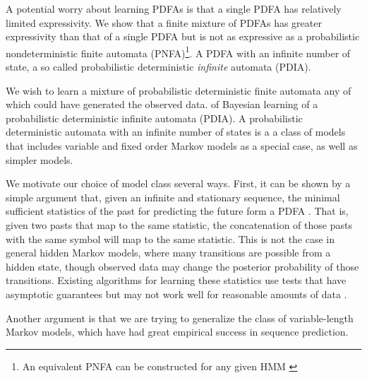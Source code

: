 A potential worry about learning PDFAs is that a single PDFA has relatively limited expressivity.  We show that a finite mixture of PDFAs has greater expressivity than that of a single PDFA but is not as expressive as a probabilistic nondeterministic finite automata (PNFA)\footnote{An equivalent PNFA can be constructed for any given HMM \cite{Dupont2005} }.  A PDFA with an infinite number of state, a so called probabilistic deterministic {\em infinite} automata (PDIA).

 We wish to learn a mixture of probabilistic deterministic finite automata any of which could have generated the observed data.  of Bayesian learning of a probabilistic deterministic infinite automata (PDIA).  A probabilistic deterministic automata with an infinite number of states is a  a class of models that includes variable and fixed order Markov models as a special case, as well as simpler models.  


We motivate our choice of model class several ways.  First, it can be shown by a simple argument that, given an infinite and stationary sequence, the minimal sufficient statistics of the past for predicting the future form a PDFA \cite{Crutchfield1999}.  That is, given two pasts that map to the same statistic, the concatenation of those pasts with the same symbol will map to the same statistic.  This is not the case in general hidden Markov models, where many transitions are possible from a hidden state, though observed data may change the posterior probability of those transitions.  Existing algorithms for learning these statistics use tests that have asymptotic guarantees but may not work well for reasonable amounts of data \cite{Shalizi2004}.

Another argument is that we are trying to generalize the class of variable-length Markov models, which have had great empirical success in sequence prediction.

